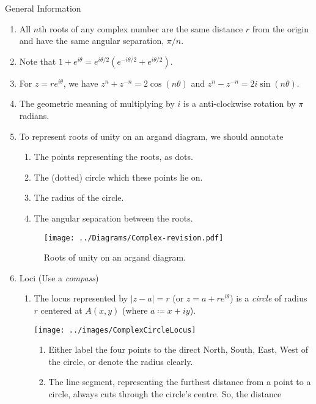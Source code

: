 \documentclass[oneside]{book}
\begin{document}
\begin{stbox}{General Information}
  \begin{enumerate}
    \item All \(n\)th roots of any complex number are the same distance \(r\) from the origin and have the same angular separation, \(\pi/n\).
    \item Note that \(1+e^{i\theta}=e^{i\theta/2}(e^{-i\theta/2}+e^{i\theta/2})\).
    \item For \(z=re^{i\theta}\), we have \(z^n+z^{-n}=2\cos(n\theta)\) and \(z^n-z^{-n}=2i\sin(n\theta)\).
    \item The geometric meaning of multiplying by \(i\) is a anti-clockwise rotation by \(\pi\) radians.
    \item To represent roots of unity on an argand diagram, we should annotate 
    \begin{enumerate}
      \item The points representing the roots, as dots.
      \item The (dotted) circle which these points lie on.
      \item The radius of the circle.
      \item The angular separation between the roots.
    \end{enumerate}
    \begin{figure}[H]
      \centering
      \texttt{[image: ../Diagrams/Complex-revision.pdf]}
      \caption{Roots of unity on an argand diagram.}
      \label{fig:roots-of-unity}
    \end{figure}
    \item Loci (Use a \emph{compass})
    \begin{enumerate}
      \item The locus represented by \(\lvert z-a \rvert =r\) (or \(z=a+re^{i\theta}\)) is a \emph{circle} of radius \(r\) centered at \(A(x,y)\) (where \(a\coloneq x+iy\)).
      \begin{center}
        \texttt{[image: ../images/ComplexCircleLocus]}
      \end{center}
      \begin{enumerate}
        \item Either label the four points to the direct North, South, East, West of the circle, or denote the radius clearly. 
        \item The line segment, representing the furthest distance from a point to a circle, always cuts through the circle's centre. So, the distance

\end{enumerate}
\end{enumerate}
\end{enumerate}
\end{stbox}
\end{document}
